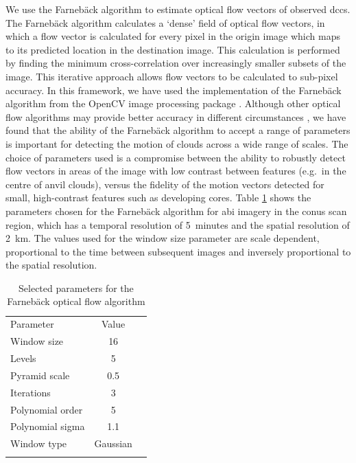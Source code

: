 We use the Farnebäck algorithm \citep{farneback_two-frame_2003} to estimate optical flow vectors of observed \acrshort{dcc}s.
The Farnebäck algorithm calculates a `dense' field of optical flow vectors, in which a flow vector is calculated for every pixel in the origin image which maps to its predicted location in the destination image.
This calculation is performed by finding the minimum cross-correlation over increasingly smaller subsets of the image.
This iterative approach allows flow vectors to be calculated to sub-pixel accuracy.
In this framework, we have used the implementation of the Farnebäck algorithm from the OpenCV image processing package \citep{opencv_library}.
Although other optical flow algorithms may provide better accuracy in different circumstances \citep{baker_database_2011}, we have found that the ability of the Farnebäck algorithm to accept a range of parameters is important for detecting the motion of clouds across a wide range of scales.
The choice of parameters used is a compromise between the ability to robustly detect flow vectors in areas of the image with low contrast between features (e.g.\ in the centre of anvil clouds), versus the fidelity of the motion vectors detected for small, high-contrast features such as developing cores.
Table \ref{table:parameters} shows the parameters chosen for the Farnebäck algorithm for \acrshort{abi} imagery in the \acrshort{conus} scan region, which has a temporal resolution of 5~minutes and the spatial resolution of 2~km.
The values used for the window size parameter are scale dependent, proportional to the time between subsequent images and inversely proportional to the spatial resolution.
\begin{table}[t]
\centering
\begin{tabular}{lcr}
\tophline
Parameter        & Value    \\ 
\middlehline
Window size      & 16       \\
Levels           & 5        \\
Pyramid scale    & 0.5      \\
Iterations       & 3        \\
Polynomial order & 5        \\
Polynomial sigma & 1.1      \\
Window type      & Gaussian \\
\bottomhline
\end{tabular}
\caption[
    Selected parameters for the Farnebäck optical flow algorithm
    ]{
    Selected parameters for the Farnebäck optical flow algorithm
    }
\label{table:parameters}
\end{table}

